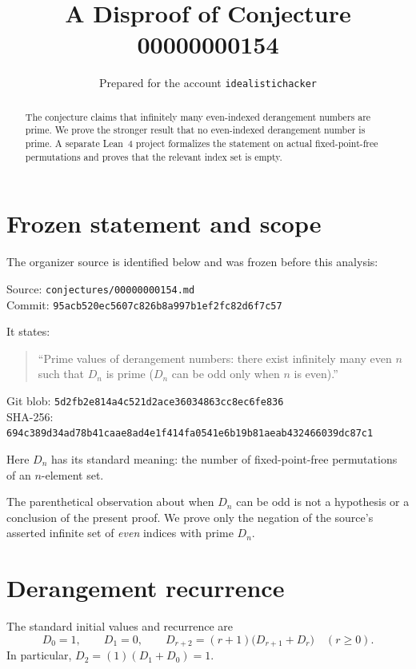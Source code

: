 \documentclass[11pt]{article}
\title{A Disproof of Conjecture 00000000154}
\author{Prepared for the account \texttt{idealistichacker}}
\date{}
\begin{document}
\maketitle

\begin{abstract}
The conjecture claims that infinitely many even-indexed derangement numbers
are prime. We prove the stronger result that no even-indexed derangement
number is prime. A separate Lean~4 project formalizes the statement on actual
fixed-point-free permutations and proves that the relevant index set is empty.
\end{abstract}

\section*{Frozen statement and scope}
The organizer source is identified below and was frozen before this analysis:
\begin{flushleft}
\footnotesize
Source: \texttt{conjectures/00000000154.md}\\
Commit: \texttt{95acb520ec5607c826b8a997b1ef2fc82d6f7c57}
\end{flushleft}
It states:

\begin{quote}
``Prime values of derangement numbers: there exist infinitely many even $n$
such that $D_n$ is prime ($D_n$ can be odd only when $n$ is even).''
\end{quote}

\begin{flushleft}
\footnotesize
Git blob: \texttt{5d2fb2e814a4c521d2ace36034863cc8ec6fe836}\\
SHA-256: \texttt{694c389d34ad78b41caae8ad4e1f414fa0541e6b19b81aeab432466039dc87c1}
\end{flushleft}
Here $D_n$ has its standard meaning: the number of fixed-point-free
permutations of an $n$-element set.

The parenthetical observation about when $D_n$ can be odd is not a hypothesis
or a conclusion of the present proof.  We prove only the negation of the
source's asserted infinite set of \emph{even} indices with prime $D_n$.

\section*{Derangement recurrence}
The standard initial values and recurrence are
\[
 D_0=1,\qquad D_1=0,\qquad
 D_{r+2}=(r+1)\bigl(D_{r+1}+D_r\bigr) \quad (r\geq0).
\]
In particular, $D_2=(1)(D_1+D_0)=1$.
\end{document}
